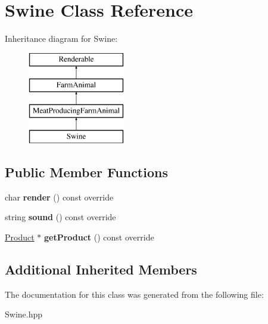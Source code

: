 \hypertarget{class_swine}{}\section{Swine Class Reference}
\label{class_swine}
Inheritance diagram for Swine\+:\begin{figure}[H]
\begin{center}
\leavevmode
\includegraphics[height=4.000000cm]{class_swine}
\end{center}
\end{figure}
\subsection*{Public Member Functions}
\begin{DoxyCompactItemize}
\item 
\mbox{\label{class_swine_a2c75aa06dedaafc6217f9b6bab00fe71}} 
char {\bfseries render} () const override
\item 
\mbox{\label{class_swine_acf7d690f23e301440608c7cb1b7eec91}} 
string {\bfseries sound} () const override
\item 
\mbox{\label{class_swine_ad654e7ad9b11b277e2ada28c88f3688f}} 
\mbox{\hyperlink{class_product}{Product}} $\ast$ {\bfseries get\+Product} () const override
\end{DoxyCompactItemize}
\subsection*{Additional Inherited Members}


The documentation for this class was generated from the following file\+:\begin{DoxyCompactItemize}
\item 
Swine.\+hpp\end{DoxyCompactItemize}
